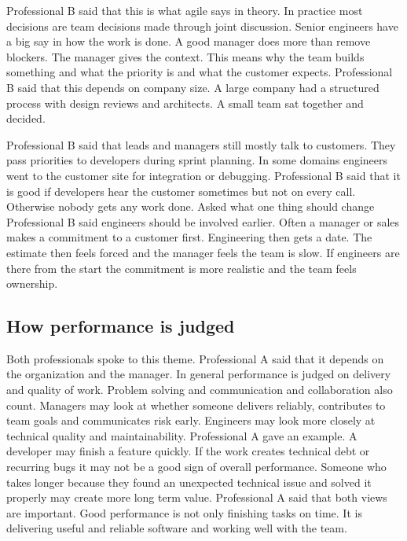 \documentclass[conference]{IEEEtran}
\begin{document}
Professional B said that this is what agile says in theory. In practice most decisions are team decisions made through joint discussion. Senior engineers have a big say in how the work is done. A good manager does more than remove blockers. The manager gives the context. This means why the team builds something and what the priority is and what the customer expects. Professional B said that this depends on company size. A large company had a structured process with design reviews and architects. A small team sat together and decided.

Professional B said that leads and managers still mostly talk to customers. They pass priorities to developers during sprint planning. In some domains engineers went to the customer site for integration or debugging. Professional B said that it is good if developers hear the customer sometimes but not on every call. Otherwise nobody gets any work done. Asked what one thing should change Professional B said engineers should be involved earlier. Often a manager or sales makes a commitment to a customer first. Engineering then gets a date. The estimate then feels forced and the manager feels the team is slow. If engineers are there from the start the commitment is more realistic and the team feels ownership.

\subsection{How performance is judged}

Both professionals spoke to this theme. Professional A said that it depends on the organization and the manager. In general performance is judged on delivery and quality of work. Problem solving and communication and collaboration also count. Managers may look at whether someone delivers reliably, contributes to team goals and communicates risk early. Engineers may look more closely at technical quality and maintainability. Professional A gave an example. A developer may finish a feature quickly. If the work creates technical debt or recurring bugs it may not be a good sign of overall performance. Someone who takes longer because they found an unexpected technical issue and solved it properly may create more long term value. Professional A said that both views are important. Good performance is not only finishing tasks on time. It is delivering useful and reliable software and working well with the team.
\end{document}

